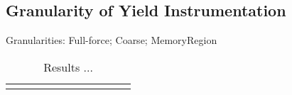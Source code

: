 \subsection{Granularity of Yield Instrumentation}
\label{eval:granularity}

Granularities: Full-force; Coarse; MemoryRegion

\newcommand{\colspacing}{\hspace{1.8em}}
\begin{table*}[t]
\small
\centering
\begin{tabular}{l rrrr rrrr rr}
\centering

\end{tabular}
\caption{Results ...}
\label{tab:granularity}
\end{table*}